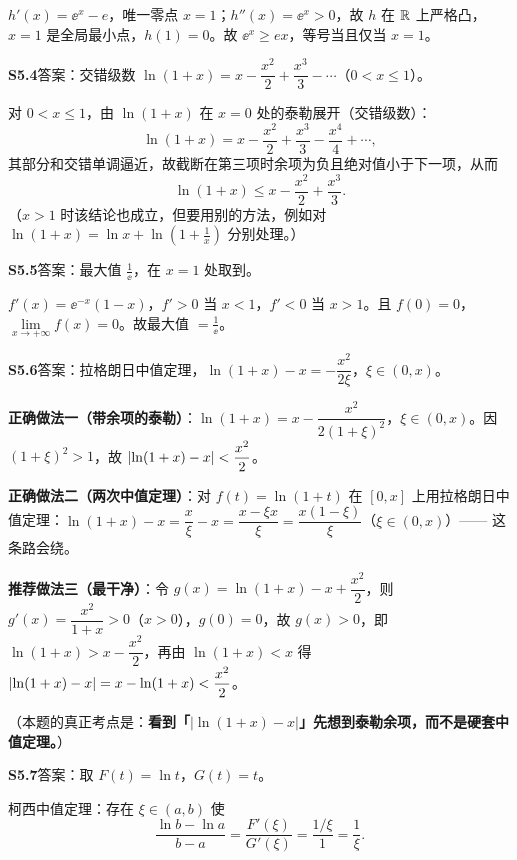 $h'(x)=\ee^{x}-e$，唯一零点 $x=1$；$h''(x)=\ee^{x}>0$，故 $h$ 在 $\mathbb{R}$ 上严格凸，$x=1$ 是全局最小点，$h(1)=0$。故 $\ee^{x}\geq ex$，等号当且仅当 $x=1$。

\medskip
\noindent\textbf{S5.4}\quad 答案：交错级数 $\ln(1+x)=x-\dfrac{x^{2}}2+\dfrac{x^{3}}3-\cdots$（$0<x\leq1$）。

对 $0<x\leq1$，由 $\ln(1+x)$ 在 $x=0$ 处的泰勒展开（交错级数）：
\[
\ln(1+x)=x-\frac{x^{2}}2+\frac{x^{3}}3-\frac{x^{4}}4+\cdots,
\]
其部分和交错单调逼近，故截断在第三项时余项为负且绝对值小于下一项，从而
\[
\ln(1+x)\leq x-\frac{x^{2}}2+\frac{x^{3}}3.
\]
（$x>1$ 时该结论也成立，但要用别的方法，例如对 $\ln(1+x)=\ln x+\ln\left(1+\frac1x\right)$ 分别处理。）

\medskip
\noindent\textbf{S5.5}\quad 答案：最大值 $\frac1\ee$，在 $x=1$ 处取到。

$f'(x)=\ee^{-x}(1-x)$，$f'>0$ 当 $x<1$，$f'<0$ 当 $x>1$。且 $f(0)=0$，$\lim\limits_{x\to+\infty}f(x)=0$。故最大值 $=\frac1\ee$。

\medskip
\noindent\textbf{S5.6}\quad 答案：拉格朗日中值定理，$\ln(1+x)-x=-\dfrac{x^{2}}{2\xi}$，$\xi\in(0,x)$。

\textbf{正确做法一（带余项的泰勒）}：$\ln(1+x)=x-\dfrac{x^{2}}{2(1+\xi)^{2}}$，$\xi\in(0,x)$。因 $(1+\xi)^{2}>1$，故 $\left\lvert \ln(1+x)-x\right\rvert<\dfrac{x^{2}}2$。

\textbf{正确做法二（两次中值定理）}：对 $f(t)=\ln(1+t)$ 在 $[0,x]$ 上用拉格朗日中值定理：$\ln(1+x)-x=\dfrac{x}{\xi}-x=\dfrac{x-\xi x}{\xi}=\dfrac{x(1-\xi)}{\xi}$（$\xi\in(0,x)$）—— 这条路会绕。

\textbf{推荐做法三（最干净）}：令 $g(x)=\ln(1+x)-x+\dfrac{x^{2}}2$，则 $g'(x)=\dfrac{x^{2}}{1+x}>0$（$x>0$），$g(0)=0$，故 $g(x)>0$，即 $\ln(1+x)>x-\dfrac{x^{2}}2$，再由 $\ln(1+x)<x$ 得 $\left\lvert \ln(1+x)-x\right\rvert=x-\ln(1+x)<\dfrac{x^{2}}2$。

（本题的真正考点是：\textbf{看到「$|\ln(1+x)-x|$」先想到泰勒余项，而不是硬套中值定理。}）

\medskip
\noindent\textbf{S5.7}\quad 答案：取 $F(t)=\ln t$，$G(t)=t$。

柯西中值定理：存在 $\xi\in(a,b)$ 使
\[
\frac{\ln b-\ln a}{b-a}=\frac{F'(\xi)}{G'(\xi)}=\frac{1/\xi}{1}=\frac{1}{\xi}.
\]

